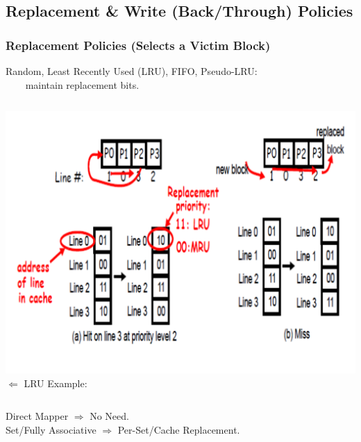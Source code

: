 \documentclass{beamer}
\newcommand{\emp}[1]{\textcolor{DikuRed}{ #1}}
\begin{document}
\subsection{Replacement \& Write (Back/Through) Policies}
\begin{frame}[fragile,t]
\frametitle{Replacement Policies (Selects a Victim Block)}

Random, Least Recently Used (LRU), FIFO, Pseudo-LRU:\\
    {\tt~~~~}maintain replacement bits.

\vspace{-2ex}
\begin{columns}
\hspace{-5ex}\includegraphics[width=50ex]{FigsMemH/LRU}\pause
{}
$\Leftarrow$ LRU Example:
\end{columns}
\vspace{-2ex}
\emp{Direct Mapper $\Rightarrow$ No Need.}\\
\emp{Set/Fully Associative $\Rightarrow$ Per-Set/Cache Replacement.}

\end{frame}
\end{document}
